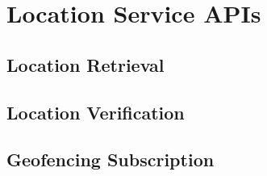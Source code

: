 
\section{Location Service APIs}
\subsection{Location Retrieval}
\subsection{Location Verification}
\subsection{Geofencing Subscription}

